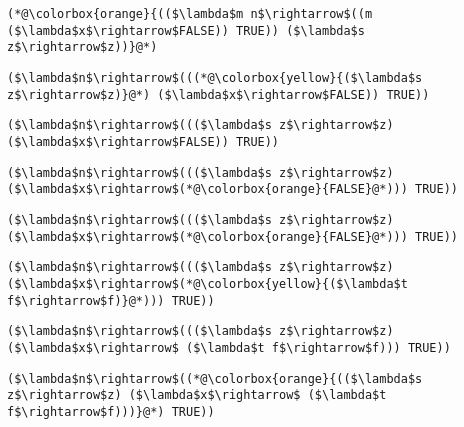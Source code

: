 \documentclass{beamer}
\begin{document}
\begin{frame}[fragile]{\CurrentSection}
\lstset{basicstyle=\ttfamily\small}\lstset{numbers=none}\lstset{language=ML}\begin{lstlisting}
(*@\colorbox{orange}{(($\lambda$m n$\rightarrow$((m ($\lambda$x$\rightarrow$FALSE)) TRUE)) ($\lambda$s z$\rightarrow$z))}@*)
\end{lstlisting}
\pause\lstset{language=ML}\begin{lstlisting}
($\lambda$n$\rightarrow$(((*@\colorbox{yellow}{($\lambda$s z$\rightarrow$z)}@*) ($\lambda$x$\rightarrow$FALSE)) TRUE))
\end{lstlisting}

\end{frame}

\begin{frame}[fragile]{\CurrentSection}
\lstset{basicstyle=\ttfamily\small}\lstset{numbers=none}\lstset{language=ML}\begin{lstlisting}
($\lambda$n$\rightarrow$((($\lambda$s z$\rightarrow$z) ($\lambda$x$\rightarrow$FALSE)) TRUE))
\end{lstlisting}
\pause\lstset{language=ML}\begin{lstlisting}
($\lambda$n$\rightarrow$((($\lambda$s z$\rightarrow$z) ($\lambda$x$\rightarrow$(*@\colorbox{orange}{FALSE}@*))) TRUE))
\end{lstlisting}

\end{frame}

\begin{frame}[fragile]{\CurrentSection}
\lstset{basicstyle=\ttfamily\small}\lstset{numbers=none}\lstset{language=ML}\begin{lstlisting}
($\lambda$n$\rightarrow$((($\lambda$s z$\rightarrow$z) ($\lambda$x$\rightarrow$(*@\colorbox{orange}{FALSE}@*))) TRUE))
\end{lstlisting}
\pause\lstset{language=ML}\begin{lstlisting}
($\lambda$n$\rightarrow$((($\lambda$s z$\rightarrow$z) ($\lambda$x$\rightarrow$(*@\colorbox{yellow}{($\lambda$t f$\rightarrow$f)}@*))) TRUE))
\end{lstlisting}

\end{frame}

\begin{frame}[fragile]{\CurrentSection}
\lstset{basicstyle=\ttfamily\small}\lstset{numbers=none}\lstset{language=ML}\begin{lstlisting}
($\lambda$n$\rightarrow$((($\lambda$s z$\rightarrow$z) ($\lambda$x$\rightarrow$ ($\lambda$t f$\rightarrow$f))) TRUE))
\end{lstlisting}
\pause\lstset{language=ML}\begin{lstlisting}
($\lambda$n$\rightarrow$((*@\colorbox{orange}{(($\lambda$s z$\rightarrow$z) ($\lambda$x$\rightarrow$ ($\lambda$t f$\rightarrow$f)))}@*) TRUE))
\end{lstlisting}

\end{frame}
\end{document}
